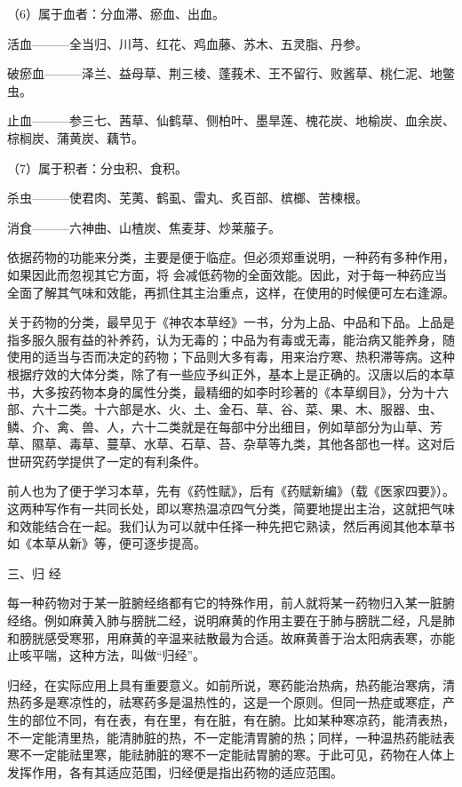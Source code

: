 \documentclass[12pt,UTF8]{ctexbook}
\begin{document}
（6）属于血者：分血滞、瘀血、出血。

活血———全当归、川芎、红花、鸡血藤、苏木、五灵脂、丹参。

破瘀血———泽兰、益母草、荆三棱、蓬莪术、王不留行、败酱草、桃仁泥、地鳖虫。

止血———参三七、茜草、仙鹤草、侧柏叶、墨旱莲、槐花炭、地榆炭、血余炭、棕榈炭、蒲黄炭、藕节。

（7）属于积者：分虫积、食积。

杀虫———使君肉、芜荑、鹤虱、雷丸、炙百部、槟榔、苦楝根。

消食———六神曲、山楂炭、焦麦芽、炒莱菔子。

依据药物的功能来分类，主要是便于临症。但必须郑重说明，一种药有多种作用，如果因此而忽视其它方面，将
会减低药物的全面效能。因此，对于每一种药应当全面了解其气味和效能，再抓住其主治重点，这样，在使用的时候便可左右逢源。

关于药物的分类，最早见于《神农本草经》一书，分为上品、中品和下品。上品是指多服久服有益的补养药，认为无毒的；中品为有毒或无毒，能治病又能养身，随使用的适当与否而决定的药物；下品则大多有毒，用来治疗寒、热积滞等病。这种根据疗效的大体分类，除了有一些应予纠正外，基本上是正确的。汉唐以后的本草书，大多按药物本身的属性分类，最精细的如李时珍著的《本草纲目》，分为十六部、六十二类。十六部是水、火、土、金石、草、谷、菜、果、木、服器、虫、鳞、介、禽、兽、人，六十二类就是在每部中分出细目，例如草部分为山草、芳草、隰草、毒草、蔓草、水草、石草、苔、杂草等九类，其他各部也一样。这对后世研究药学提供了一定的有利条件。

前人也为了便于学习本草，先有《药性赋》，后有《药赋新编》（载《医家四要》）。这两种写作有一共同长处，即以寒热温凉四气分类，简要地提出主治，这就把气味和效能结合在一起。我们认为可以就中任择一种先把它熟读，然后再阅其他本草书如《本草从新》等，便可逐步提高。

三、归 经

每一种药物对于某一脏腑经络都有它的特殊作用，前人就将某一药物归入某一脏腑经络。例如麻黄入肺与膀胱二经，说明麻黄的作用主要在于肺与膀胱二经，凡是肺和膀胱感受寒邪，用麻黄的辛温来祛散最为合适。故麻黄善于治太阳病表寒，亦能止咳平喘，这种方法，叫做“归经”。

归经，在实际应用上具有重要意义。如前所说，寒药能治热病，热药能治寒病，清热药多是寒凉性的，祛寒药多是温热性的，这是一个原则。但同一热症或寒症，产生的部位不同，有在表，有在里，有在脏，有在腑。比如某种寒凉药，能清表热，不一定能清里热，能清肺脏的热，不一定能清胃腑的热；同样，一种温热药能祛表寒不一定能祛里寒，能祛肺脏的寒不一定能祛胃腑的寒。于此可见，药物在人体上发挥作用，各有其适应范围，归经便是指出药物的适应范围。
\end{document}
